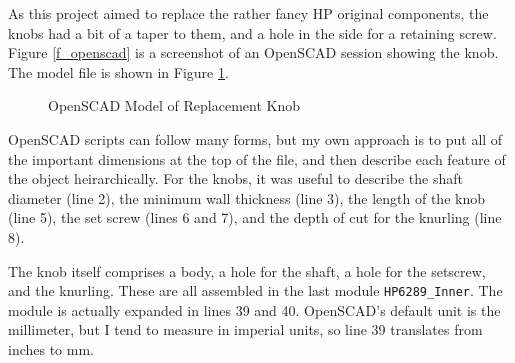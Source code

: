 \documentclass[12pt]{article}
\begin{document}
As this project aimed to replace the rather fancy HP original components,
the knobs had a bit of a taper to them, and a hole in the side for a
retaining screw. Figure \ref{f_openscad} is a screenshot of an OpenSCAD
session showing the knob. The model file is shown in Figure \ref{f_knob_list}.

\begin{figure}[htbp]
  
  \caption{\label{f_knob_list}OpenSCAD Model of Replacement Knob}
  \end{figure}

OpenSCAD scripts can follow many forms, but my own approach is to put
all of the important dimensions at the top of the file, and then
describe each feature of the object heirarchically.  For the knobs,
it was useful to describe the shaft diameter (line 2), 
the minimum wall thickness (line 3), the length of the knob (line 5),
the set screw (lines 6 and 7), and the depth of cut for the knurling (line 8).

The knob itself comprises a body, a hole for the shaft, a hole for the
setscrew, and the knurling.  These are all assembled in the last module
{\tt HP6289\_Inner}. The module is actually expanded in lines 39 and 40.
OpenSCAD's default unit is the millimeter, but I tend to measure in
imperial units, so line 39 translates from inches to mm. 
\end{document}
